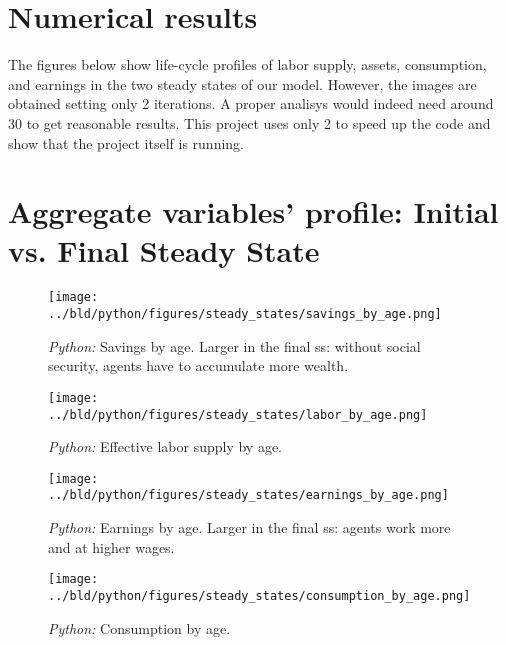 \documentclass[11pt, a4paper, leqno]{article}
\begin{document}
\section{Numerical results} %
The figures below show life-cycle profiles of labor supply, assets, 
consumption, and earnings in the two steady states of
our model. However, the images are obtained setting only 2 iterations.
 A proper analisys would indeed need around 30 to get reasonable results.
This project uses only 2 to speed up the code and show that the project itself is running.

\begin{table}[!htb]
    
\end{table}

\clearpage

\section{Aggregate variables' profile: Initial vs. Final Steady State}
\begin{figure}[ht]

\centering
\texttt{[image: ../bld/python/figures/steady\_states/savings\_by\_age.png]}
\caption{\emph{Python:} Savings by age. Larger in the final ss: without social security, agents have to accumulate more wealth.}
\label{fig:python-K}
\end{figure}

\begin{figure}[ht]
    
    \centering
    \texttt{[image: ../bld/python/figures/steady\_states/labor\_by\_age.png]}
    \caption{\emph{Python:} Effective labor supply by age.}
    \label{fig:python-L}

\end{figure}

\begin{figure}[ht]

    \centering
    \texttt{[image: ../bld/python/figures/steady\_states/earnings\_by\_age.png]}
    \caption{\emph{Python:} Earnings by age. Larger in the final ss: agents work more and at higher wages.}
    \label{fig:python-E}

\end{figure}


\begin{figure}[ht]

    \centering
    \texttt{[image: ../bld/python/figures/steady\_states/consumption\_by\_age.png]}
    \caption{\emph{Python:} Consumption by age.}
    \label{fig:python-C}

\end{figure}
\end{document}
